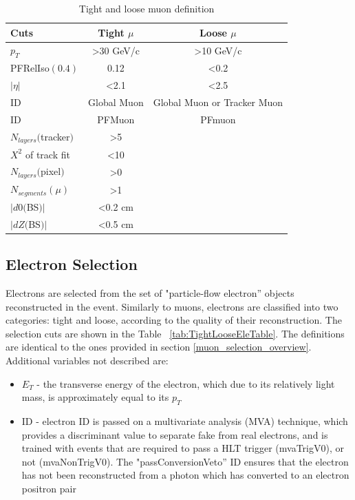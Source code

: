 \begin{table}[hbtp]\footnotesize
\centering
\begin{tabular}{|l|c|c|}
\hline\hline
Cuts & Tight $\mu$ & Loose $\mu$ \\
\hline
$p_{T}$ & \textgreater 30 GeV/c & \textgreater 10 GeV/c \\
\hline
PFRelIso$(0.4)$ & 0.12  & \textless 0.2 \\
\hline
$|\eta|$ & \textless 2.1 & \textless 2.5 \\
\hline
ID & Global Muon & Global Muon or Tracker Muon \\
\hline
ID & PFMuon & PFmuon \\
\hline
$N_{layers}($tracker$)$ & \textgreater 5 & \\
\hline
${X}^2$ of track fit & \textless 10 & \\
\hline
$N_{layers}($pixel$)$ & \textgreater 0 & \\
\hline
$N_{segments}(\mu)$ & \textgreater 1 & \\
\hline
$|d0($BS$)|$ & \textless 0.2 cm & \\
\hline
$|dZ($BS$)|$ & \textless 0.5 cm & \\
\hline\hline
\end{tabular}
\caption{Tight and loose muon definition}
\label{tab:TightLooseMuTable}
\end{table}



\subsection{Electron Selection}
\label{electron_selection_overview}

\par Electrons are selected from the set of "particle-flow electron''
objects reconstructed in the event.  Similarly to muons, electrons are
classified into two categories: tight and loose, according to the
quality of their reconstruction.  The selection cuts are shown in the
Table ~\ref{tab:TightLooseEleTable}.  The definitions are identical to
the ones provided in section \ref{muon_selection_overview}.
Additional variables not described are:

\begin{itemize}
  \item $E_{T}$ - the transverse energy of the electron, which due to
    its relatively light mass, is approximately equal to its $p_{T}$
  \item ID - electron ID is passed on a multivariate analysis (MVA)
  technique, which provides a discriminant value to separate fake from
  real electrons, and is trained with events that are required to pass
  a HLT trigger (mvaTrigV0), or not (mvaNonTrigV0).  The
  "passConversionVeto'' ID ensures that the electron has not been
  reconstructed from a photon which has converted to an electron
  positron pair
\end{itemize}

